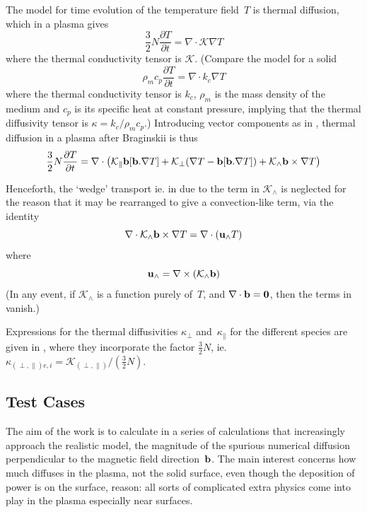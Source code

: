 The model for time evolution of the temperature field~$T$ is thermal diffusion,
which in a plasma gives
\begin{equation}\label{eq:plas2diff}
\frac{3}{2} N \frac{\partial T}{\partial t}=\nabla \cdot \mathcal{K}  \nabla T
\end{equation}
where the thermal conductivity tensor is $\mathcal{K}$.
(Compare the model for a solid
\begin{equation}\label{eq:solidiff}
\rho_m c_p \frac{\partial T}{\partial t}=\nabla \cdot k_c \nabla T
\end{equation}
where the thermal conductivity tensor is $k_c$, $\rho_m$ is the mass density of the medium 
and $c_p$ is its specific heat at constant pressure, implying
that the thermal diffusivity tensor is $\kappa=k_c/\rho_m c_p$.)
Introducing vector components as  in ,
thermal diffusion in a plasma after Braginskii is thus
\begin{equation}\label{eq:plas2brag}
\frac{3}{2} N \frac{\partial T}{\partial t}=
\nabla \cdot \left(
\mathcal{K}_{\|} {\bf b} [{\bf b}.\nabla T] +
\mathcal{K}_{\perp} (\nabla T - {\bf b} [{\bf b}.\nabla T])+
\mathcal{K}_{\wedge} {\bf b} \times \nabla T
\right) 
\end{equation}

Henceforth, the `wedge' transport ie. in due to the term in $\mathcal{K}_{\wedge}$
is neglected for the reason that it may be rearranged to give
a convection-like term, via the identity 
\begin{equation}\label{eq:crossxp}
\nabla \cdot \mathcal{K}_\wedge {\bf b} \times \nabla T = \nabla \cdot ({\bf u}_\wedge  T)
\end{equation}
where
\begin{equation}\label{eq:uxp}
{\bf u}_\wedge = \nabla \times (\mathcal{K}_\wedge {\bf b})
\end{equation}
(In any event, if $\mathcal{K}_\wedge$ is a function purely of~$T$, and
$\nabla \cdot {\bf b}=\bf{0}$, then the terms in  vanish.)

Expressions for the thermal diffusivities $\kappa_{\perp}$ and~$\kappa_{\|}$ for
the different species
are given in , where they incorporate  the factor $\frac{3}{2} N$,
ie.\ $\kappa_{(\perp , \|) e,i}=\mathcal{K}_{(\perp, \|)}/(\frac{3}{2} N)$.

\subsection{Test Cases}\label{sec:tests}
The aim of the work is to calculate in a series of calculations that increasingly
approach the realistic model, the magnitude of the spurious numerical diffusion
perpendicular to the magnetic field direction~${\bf b}$. The main interest concerns
how much diffuses in the plasma, not the solid surface, even though the deposition
of power is on the surface, reason: all sorts of complicated extra physics come
into play in the plasma especially near surfaces.
